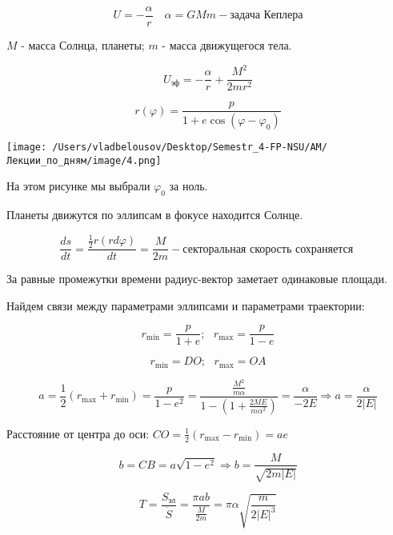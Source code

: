 \documentclass[12pt, a4paper]{report}
\begin{document}
\fi


\[ U= -\frac{\alpha}{r }  \quad  \alpha= G M m - \text{задача Кеплера}   \] 

\( M  \)  - масса Солнца, планеты; \( m  \) - масса движущегося тела.

\[ U_{\text{эф} } = -\frac{\alpha}{r }  + \frac{ M ^2 }{2m r ^2 }   \] 

\[ r(\varphi ) = \frac{p}{1+ e \cos (\varphi - \varphi_0 )}  \] 

\begin{center}
    \texttt{[image: /Users/vladbelousov/Desktop/Semestr\_4-FP-NSU/АМ/Лекции\_по\_дням/image/4.png]}
\end{center}


На этом рисунке мы выбрали \( \varphi_0  \) за ноль.

\begin{definition}
    Планеты движутся по эллипсам в фокусе находится Солнце. 

    \[ \frac{ds}{dt }  = \frac{\frac{1}{2 } r (r d \varphi )}{dt } = \frac{M}{2 m }     -\text{секторальная скорость сохраняется }   \] 

\end{definition}

\begin{definition}
    За равные промежутки времени радиус-вектор заметает одинаковые площади.
\end{definition}

Найдем связи между параметрами эллипсами и параметрами траектории: 

\[ r_{\min } = \frac{p}{1+e } ; \text{ } r_{\max } = \frac{p}{1-e}       \] 

\[ r_{\min } = DO ; \text{ } r_{\max } = OA     \]

\[ a =\frac{1}{2 }  ( r_{\max  } + r_{\min }  ) = \frac{p}{1- e ^2 } = \frac{\frac{M ^2 }{m \alpha } }{1- (1+ \frac{2M E }{m \alpha ^2 } )}= \frac{\alpha}{- 2E}  \Rightarrow a = \frac{\alpha}{2 |E|}   \] 

Расстояние от центра до оси: \( \displaystyle CO = \frac{1}{2 }  ( r_{\max  } - r_{\min  }  )= ae  \) 

\[ b = CB = a \sqrt{ 1 - e ^2 } \Rightarrow b = \frac{M}{\sqrt{2m|E|}}   \] 

\[  T =\frac{S_{\text{эл} } }{\dot{S} }= \frac{\pi ab }{\frac{M}{2m } } =\pi \alpha \sqrt{\frac{m}{2 |E| ^3} }     
\] 
\end{document}
